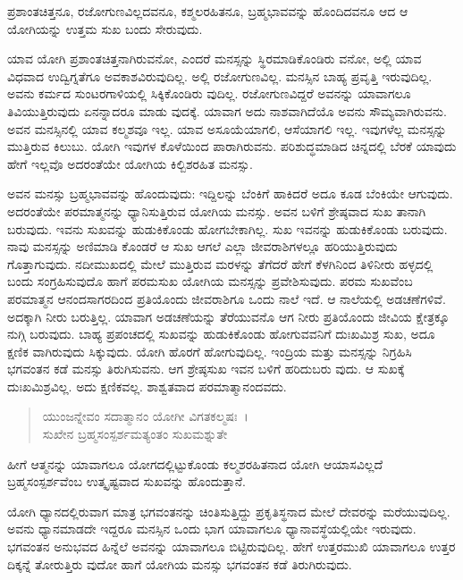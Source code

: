 {\small ಪ್ರಶಾಂತಚಿತ್ತನೂ, ರಜೋಗುಣವಿಲ್ಲದವನೂ, ಕಶ್ಮಲರಹಿತನೂ, ಬ್ರಹ್ಮಭಾವವನ್ನು ಹೊಂದಿದವನೂ ಆದ ಆ ಯೋಗಿಯನ್ನು ಉತ್ತಮ ಸುಖ ಬಂದು ಸೇರುವುದು.}

ಯಾವ ಯೋಗಿ ಪ್ರಶಾಂತಚಿತ್ತನಾಗಿರುವನೋ, ಎಂದರೆ ಮನಸ್ಸನ್ನು ಸ್ಥಿರಮಾಡಿಕೊಂಡಿರು ವನೋ, ಅಲ್ಲಿ ಯಾವ ವಿಧವಾದ ಉದ್ವಿಗ್ನತೆಗೂ ಅವಕಾಶವಿರುವುದಿಲ್ಲ. ಅಲ್ಲಿ ರಜೋಗುಣವಿಲ್ಲ. ಮನಸ್ಸಿನ ಬಾಹ್ಯ ಪ್ರವೃತ್ತಿ ಇರುವುದಿಲ್ಲ. ಅವನು ಕರ್ಮದ ಸುಂಟರಗಾಳಿಯಲ್ಲಿ ಸಿಕ್ಕಿಕೊಂಡಿರು ವುದಿಲ್ಲ. ರಜೋಗುಣವಿದ್ದರೆ ಅವನನ್ನು ಯಾವಾಗಲೂ ತಿವಿಯುತ್ತಿರುವುದು ಏನನ್ನಾದರೂ ಮಾಡು ವುದಕ್ಕೆ. ಯಾವಾಗ ಅದು ನಾಶವಾಗಿದೆಯೊ ಅವನು ಸೌಮ್ಯವಾಗಿರುವನು. ಅವನ ಮನಸ್ಸಿನಲ್ಲಿ ಯಾವ ಕಲ್ಮಶವೂ ಇಲ್ಲ. ಯಾವ ಅಸೂಯೆಯಾಗಲಿ, ಆಸೆಯಾಗಲಿ ಇಲ್ಲ. ಇವುಗಳೆಲ್ಲ ಮನಸ್ಸನ್ನು ಮುತ್ತಿರುವ ಕಿಲುಬು. ಯೋಗಿ ಇವುಗಳ ಕೊಳೆಯಿಂದ ಪಾರಾಗಿರುವನು. ಪರಿಶುದ್ಧಮಾಡಿದ ಚಿನ್ನದಲ್ಲಿ ಬೆರಕೆ ಯಾವುದು ಹೇಗೆ ಇಲ್ಲವೊ ಅದರಂತೆಯೇ ಯೋಗಿಯ ಕಿಲ್ಬಿಶರಹಿತ ಮನಸ್ಸು.

ಅವನ ಮನಸ್ಸು ಬ್ರಹ್ಮಭಾವವನ್ನು ಹೊಂದುವುದು: ಇದ್ದಿಲನ್ನು ಬೆಂಕಿಗೆ ಹಾಕಿದರೆ ಅದೂ ಕೂಡ ಬೆಂಕಿಯೇ ಆಗುವುದು. ಅದರಂತೆಯೇ ಪರಮಾತ್ಮನನ್ನು ಧ್ಯಾನಿಸುತ್ತಿರುವ ಯೋಗಿಯ ಮನಸ್ಸು. ಅವನ ಬಳಿಗೆ ಶ್ರೇಷ್ಠವಾದ ಸುಖ ತಾನಾಗಿ ಬರುವುದು. ಇವನು ಸುಖವನ್ನು ಹುಡುಕಿಕೊಂಡು ಹೋಗಬೇಕಾಗಿಲ್ಲ. ಸುಖ ಇವನನ್ನು ಹುಡುಕಿಕೊಂಡು ಬರುವುದು. ನಾವು ಮನಸ್ಸನ್ನು ಅಣಿಮಾಡಿ ಕೊಂಡರೆ ಆ ಸುಖ ಆಗಲೆ ಎಲ್ಲಾ ಜೀವರಾಶಿಗಳಲ್ಲೂ ಹರಿಯುತ್ತಿರುವುದು ಗೊತ್ತಾಗುವುದು. ನದೀಮುಖದಲ್ಲಿ ಮೇಲೆ ಮುತ್ತಿರುವ ಮರಳನ್ನು ತೆಗೆದರೆ ಹೇಗೆ ಕೆಳಗಿನಿಂದ ತಿಳಿನೀರು ಹಳ್ಳದಲ್ಲಿ ಬಂದು ಸಂಗ್ರಹಿಸುವುದೊ ಹಾಗೆ ಪರಮಸುಖ ಯೋಗಿಯ ಮನಸ್ಸನ್ನು ಪ್ರವೇಶಿಸುವುದು. ಪರಮ ಸುಖವೆಂಬ ಪರಮಾತ್ಮನ ಆನಂದಸಾಗರದಿಂದ ಪ್ರತಿಯೊಂದು ಜೀವರಾಶಿಗೂ ಒಂದು ನಾಲೆ ಇದೆ. ಆ ನಾಲೆಯಲ್ಲಿ ಅಡಚಣೆಗಳಿವೆ. ಅದಕ್ಕಾಗಿ ನೀರು ಬರುತ್ತಿಲ್ಲ. ಯಾವಾಗ ಅಡಚಣೆಯನ್ನು ತೆರೆಯುವನೊ ಆಗ ನೀರು ಪ್ರತಿಯೊಂದು ಜೀವಿಯ ಕ್ಷೇತ್ರಕ್ಕೂ ನುಗ್ಗಿ ಬರುವುದು. ಬಾಹ್ಯ ಪ್ರಪಂಚದಲ್ಲಿ ಸುಖವನ್ನು ಹುಡುಕಿಕೊಂಡು ಹೋಗುವವನಿಗೆ ದುಃಖಮಿಶ್ರ ಸುಖ, ಅದೂ ಕ್ಷಣಿಕ ವಾಗಿರುವುದು ಸಿಕ್ಕುವುದು. ಯೋಗಿ ಹೊರಗೆ ಹೋಗುವುದಿಲ್ಲ. ಇಂದ್ರಿಯ ಮತ್ತು ಮನಸ್ಸನ್ನು ನಿಗ್ರಹಿಸಿ ಭಗವಂತನ ಕಡೆ ಮನಸ್ಸು ತಿರುಗಿಸುವನು. ಆಗ ಶ್ರೇಷ್ಠಸುಖ ಇವನ ಬಳಿಗೆ ಹರಿದುಬರು ವುದು. ಆ ಸುಖಕ್ಕೆ ದುಃಖಮಿಶ್ರವಿಲ್ಲ. ಅದು ಕ್ಷಣಿಕವಲ್ಲ. ಶಾಶ್ವತವಾದ ಪರಮಾತ್ಮಾನಂದವದು.

\begin{verse}
ಯುಂಜನ್ನೇವಂ ಸದಾತ್ಮಾನಂ ಯೋಗೀ ವಿಗತಕಲ್ಮಷಃ~।\\ಸುಖೇನ ಬ್ರಹ್ಮಸಂಸ್ಪರ್ಶಮತ್ಯಂತಂ ಸುಖಮಶ್ನುತೇ 
\end{verse}

{\small ಹೀಗೆ ಆತ್ಮನನ್ನು ಯಾವಾಗಲೂ ಯೋಗದಲ್ಲಿಟ್ಟುಕೊಂಡು ಕಲ್ಮಶರಹಿತನಾದ ಯೋಗಿ ಆಯಾಸವಿಲ್ಲದೆ ಬ್ರಹ್ಮಸಂಸ್ಪರ್ಶವೆಂಬ ಉತ್ಕೃಷ್ಟವಾದ ಸುಖವನ್ನು ಹೊಂದುತ್ತಾನೆ.}

ಯೋಗಿ ಧ್ಯಾನದಲ್ಲಿರುವಾಗ ಮಾತ್ರ ಭಗವಂತನನ್ನು ಚಿಂತಿಸುತ್ತಿದ್ದು ಪ್ರಕೃತಿಸ್ಥನಾದ ಮೇಲೆ ದೇವರನ್ನು ಮರೆಯುವುದಿಲ್ಲ. ಅವನು ಧ್ಯಾನಮಾಡದೇ ಇದ್ದರೂ ಮನಸ್ಸಿನ ಒಂದು ಭಾಗ ಯಾವಾಗಲೂ ಧ್ಯಾನಾವಸ್ಥೆಯಲ್ಲಿಯೇ ಇರುವುದು. ಭಗವಂತನ ಅನುಭವದ ಹಿನ್ನೆಲೆ ಅವನನ್ನು ಯಾವಾಗಲೂ ಬಿಟ್ಟಿರುವುದಿಲ್ಲ. ಹೇಗೆ ಉತ್ತರಮುಖಿ ಯಾವಾಗಲೂ ಉತ್ತರ ದಿಕ್ಕನ್ನೆ ತೋರುತ್ತಿರು ವುದೋ ಹಾಗೆ ಯೋಗಿಯ ಮನಸ್ಸು ಭಗವಂತನ ಕಡೆ ತಿರುಗಿರುವುದು.


